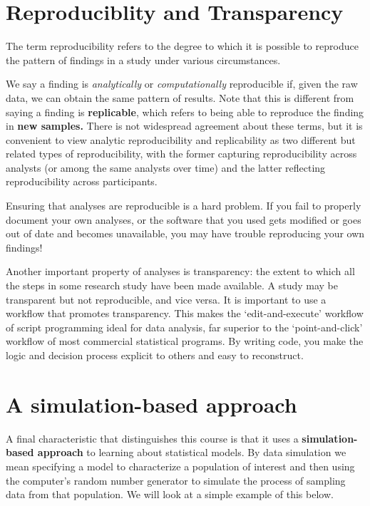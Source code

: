 \documentclass[]{book}
\begin{document}
\hypertarget{reproduciblity-and-transparency}{%
\section{Reproduciblity and Transparency}\label{reproduciblity-and-transparency}}

The term reproducibility refers to the degree to which it is possible to reproduce the pattern of findings in a study under various circumstances.

We say a finding is \emph{analytically} or \emph{computationally} reproducible if, given the raw data, we can obtain the same pattern of results. Note that this is different from saying a finding is \textbf{replicable}, which refers to being able to reproduce the finding in \textbf{new samples.} There is not widespread agreement about these terms, but it is convenient to view analytic reproducibility and replicability as two different but related types of reproducibility, with the former capturing reproducibility across analysts (or among the same analysts over time) and the latter reflecting reproducibility across participants.

Ensuring that analyses are reproducible is a hard problem. If you fail to properly document your own analyses, or the software that you used gets modified or goes out of date and becomes unavailable, you may have trouble reproducing your own findings!

Another important property of analyses is transparency: the extent to which all the steps in some research study have been made available. A study may be transparent but not reproducible, and vice versa. It is important to use a workflow that promotes transparency. This makes the `edit-and-execute' workflow of script programming ideal for data analysis, far superior to the `point-and-click' workflow of most commercial statistical programs. By writing code, you make the logic and decision process explicit to others and easy to reconstruct.

\hypertarget{a-simulation-based-approach}{%
\section{A simulation-based approach}\label{a-simulation-based-approach}}

A final characteristic that distinguishes this course is that it uses a \textbf{simulation-based approach} to learning about statistical models. By data simulation we mean specifying a model to characterize a population of interest and then using the computer's random number generator to simulate the process of sampling data from that population. We will look at a simple example of this below.
\end{document}
